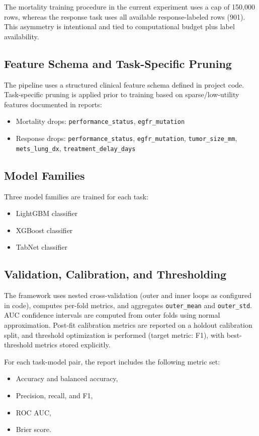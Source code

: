 \documentclass[journal]{IEEEtran}
\begin{document}
The mortality training procedure in the current experiment uses a cap of 150,000 rows, whereas the response task uses all available response-labeled rows (901). This asymmetry is intentional and tied to computational budget plus label availability.

\subsection{Feature Schema and Task-Specific Pruning}
The pipeline uses a structured clinical feature schema defined in project code. Task-specific pruning is applied prior to training based on sparse/low-utility features documented in reports:
\begin{itemize}
    \item Mortality drops: \texttt{performance\_status}, \texttt{egfr\_mutation}
    \item Response drops: \texttt{performance\_status}, \texttt{egfr\_mutation}, \texttt{tumor\_size\_mm}, \texttt{mets\_lung\_dx}, \texttt{treatment\_delay\_days}
\end{itemize}

\subsection{Model Families}
Three model families are trained for each task:
\begin{itemize}
    \item LightGBM classifier
    \item XGBoost classifier
    \item TabNet classifier
\end{itemize}

\subsection{Validation, Calibration, and Thresholding}
The framework uses nested cross-validation (outer and inner loops as configured in code), computes per-fold metrics, and aggregates \texttt{outer\_mean} and \texttt{outer\_std}. AUC confidence intervals are computed from outer folds using normal approximation. Post-fit calibration metrics are reported on a holdout calibration split, and threshold optimization is performed (target metric: F1), with best-threshold metrics stored explicitly.

For each task-model pair, the report includes the following metric set:
\begin{itemize}
    \item Accuracy and balanced accuracy,
    \item Precision, recall, and F1,
    \item ROC AUC,
    \item Brier score.
\end{itemize}
\end{document}
